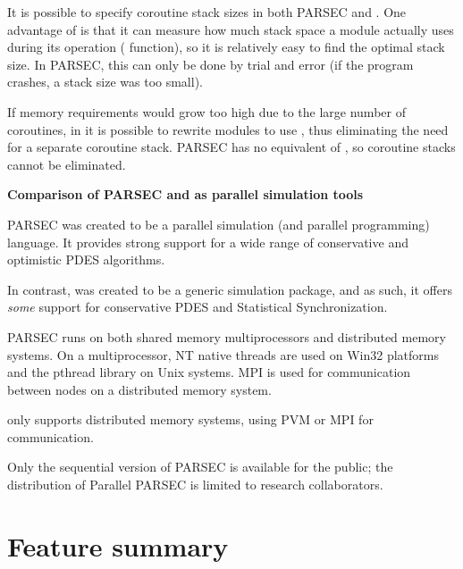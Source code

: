 It is possible to specify coroutine stack sizes in both PARSEC
and {\opp}. One advantage of {\opp} is that it can measure
how much stack space a module actually uses during its operation
( function), so it is relatively easy to find the
optimal stack size. In PARSEC, this can only be done by trial
and error (if the program crashes, a stack size was too small).

If memory requirements would grow too high due to the large number
of coroutines, in {\opp} it is possible to rewrite modules to
use , thus eliminating the need for a separate
coroutine stack. PARSEC has no equivalent of ,
so coroutine stacks cannot be eliminated.


\textbf{Comparison of PARSEC and {\opp} as parallel simulation tools}


PARSEC was created to be a parallel simulation (and parallel
programming) language. It provides strong support for a wide
range of conservative and optimistic PDES algorithms.


In contrast, {\opp} was created to be a generic simulation package,
and as such, it offers \textit{some} support for conservative PDES
and Statistical Synchronization.


PARSEC runs on both shared memory multiprocessors and distributed
memory systems. On a multiprocessor, NT native threads are used
on Win32 platforms and the pthread library on Unix systems. MPI
is used for communication between nodes on a distributed memory
system.


{\opp} only supports distributed memory systems, using PVM or
MPI for communication.

Only the sequential version of PARSEC is available for the public;
the distribution of Parallel PARSEC is limited to research collaborators.





\section{Feature summary}


